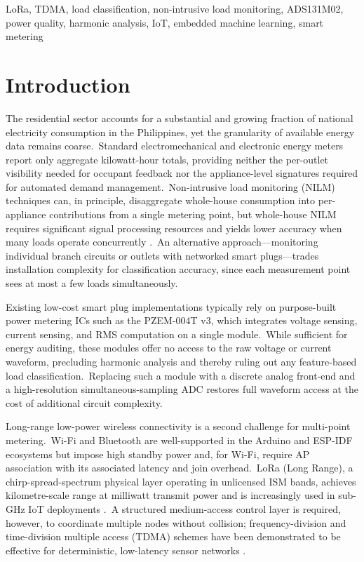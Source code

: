 \documentclass[conference]{IEEEtran}
\begin{document}
\begin{IEEEkeywords}
LoRa, TDMA, load classification, non-intrusive load monitoring,
ADS131M02, power quality, harmonic analysis, IoT, embedded machine
learning, smart metering
\end{IEEEkeywords}

\section{Introduction}
\label{sec:intro}

The residential sector accounts for a substantial and growing fraction
of national electricity consumption in the Philippines, yet the
granularity of available energy data remains coarse.\ Standard
electromechanical and electronic energy meters report only aggregate
kilowatt-hour totals, providing neither the per-outlet visibility
needed for occupant feedback nor the appliance-level signatures
required for automated demand management.\ Non-intrusive load
monitoring (NILM) techniques \cite{hart_nilm_1992} can, in principle,
disaggregate whole-house consumption into per-appliance contributions
from a single metering point, but whole-house NILM requires
significant signal processing resources and yields lower accuracy when
many loads operate concurrently \cite{zeifman_nilm_review_2011}.\ An
alternative approach---monitoring individual branch circuits or
outlets with networked smart plugs---trades installation complexity for
classification accuracy, since each measurement point sees at most a
few loads simultaneously.

Existing low-cost smart plug implementations typically rely on
purpose-built power metering ICs such as the PZEM-004T v3, which
integrates voltage sensing, current sensing, and RMS computation on a
single module.\ While sufficient for energy auditing, these modules
offer no access to the raw voltage or current waveform, precluding
harmonic analysis and thereby ruling out any feature-based load
classification.\ Replacing such a module with a discrete analog
front-end and a high-resolution simultaneous-sampling ADC restores
full waveform access at the cost of additional circuit complexity.

Long-range low-power wireless connectivity is a second challenge for
multi-point metering.\ Wi-Fi and Bluetooth are well-supported in the
Arduino and ESP-IDF ecosystems but impose high standby power and, for
Wi-Fi, require AP association with its associated latency and join
overhead.\ LoRa (Long Range), a chirp-spread-spectrum physical layer
operating in unlicensed ISM bands, achieves kilometre-scale range at
milliwatt transmit power and is increasingly used in sub-GHz IoT
deployments \cite{augustin_lora_sensors_2016}.\ A structured
medium-access control layer is required, however, to coordinate
multiple nodes without collision; frequency-division and
time-division multiple access (TDMA) schemes have been demonstrated to
be effective for deterministic, low-latency sensor networks
\cite{raza_lpwan_survey_2017}.
\end{document}
